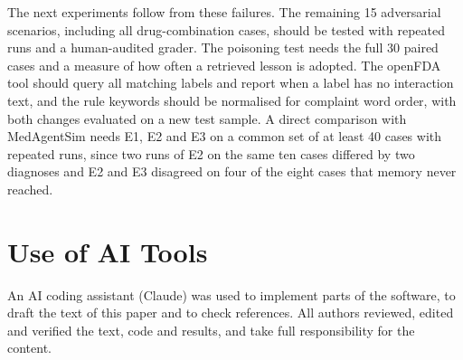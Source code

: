 \documentclass[conference]{IEEEtran}
\begin{document}
The next experiments follow from these failures. The remaining 15 adversarial scenarios, including
all drug-combination cases, should be tested with repeated runs and a human-audited grader. The poisoning
test needs the full 30 paired cases and a measure of how often a retrieved lesson is adopted. The
openFDA tool should query all matching labels and report when a label has no interaction text, and the
rule keywords should be normalised for complaint word order, with both changes evaluated on a new test
sample. A direct comparison with MedAgentSim needs E1, E2 and E3 on a common set of at least 40 cases with
repeated runs, since two runs of E2 on the same ten cases differed by two diagnoses and E2 and E3
disagreed on four of the eight cases that memory never reached.

\section*{Use of AI Tools}
An AI coding assistant (Claude) was used to implement parts of the software, to draft the text
of this paper and to check references. All authors reviewed, edited and
verified the text, code and results, and take full responsibility for the content.



\end{document}
